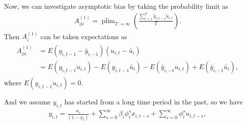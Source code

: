\documentclass[12pt,a4paper,hyperref]{article}
\DeclareMathOperator*{\plim}{plim}
\begin{document}
Now, we can investigate asymptotic bias by taking the probability limit as
\begin{align}
A^{(1)}_{\phi i}=\plim_{T  \rightarrow \infty}\left( \frac{\sum^{T}_{t=1}\tilde{y}_{i,t-1}\tilde{u}_{i,t}}{T} \right). \label{11}
\end{align}
Then $A^{(1)}_{i}$ can be taken expectations as
\begin{align}
\begin{split}
A^{(1)}_{\phi i}&=E\left(y_{i,t-1}-\bar{y}_{i,-1} \right) \left(u_{i,t}-\bar{u}_{i} \right) \\
&= E\left( y_{i,t-1}u_{i,t}\right) - E\left( y_{i,t-1} \bar{u}_{i}  \right)-E\left(\bar{y}_{i,-1}   u_{i,t}\right)+E\left(\bar{y}_{i,-1}  \bar{u}_{i}\right),
\end{split}
\end{align}
where $E\left( y_{i,t-1}u_{i,t}\right)=0$.

And we assume $y_{i,t}$ has started from a long time period in the past, so we have
\begin{align}
y_{i,t}=\frac{\alpha_{i}}{\left(1-\phi_{i} \right)}+\sum^{\infty}_{s=0}\beta_{i}\phi^{s}_{i}x_{i,t -s}+\sum^{\infty}_{s=0}\phi^{s}_{i}u_{i,t-s},
\end{align}
\end{document}
